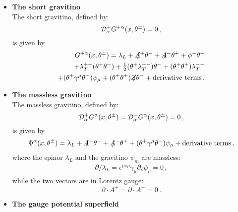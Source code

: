 \documentclass[a4paper,12pt]{article}
\newcommand{\ft}[2]{{\textstyle\frac{#1}{#2}}}
\begin{document}
\begin{itemize}
\begin{equation}
\end{equation}
\item {\bf The short gravitino}\\
The short gravitino, defined by:
\begin{equation}
{\cal D}^+_\alpha G^{+\alpha}(x,\theta^{\pm})=0\,,
\end{equation}
is given by
\begin{eqnarray}
G^{+\alpha}(x,\theta^{\pm})=\lambda_L+A\!\!\!/^+\theta^-
+A\!\!\!/^-\theta^++\phi^-\theta^+\nonumber\\
+\lambda^{+-}_T(\theta^+\theta^-)
+\ft{1}{2}(\theta^+\lambda^{+-}_T)\theta^-
+(\theta^+\theta^+)\lambda^{--}_T\nonumber\\
+(\theta^+\gamma^\mu\theta^-)\psi_\mu
+(\theta^+\theta^+)Z\!\!\!/\theta^-+{\rm derivative\ terms}\,.
\end{eqnarray}
\item {\bf The massless gravitino}\\
The massless gravitino, defined by:
\begin{equation}
{\cal D}^+_\alpha G^\alpha(x,\theta^{\pm})=
{\cal D}^-_\alpha G^\alpha(x,\theta^{\pm})=0\,,
\end{equation}
is given by
\begin{eqnarray}
\Phi^\alpha(x,\theta^{\pm})=\lambda_L+A\!\!\!/^+\theta^-
+A\!\!\!/^-\theta^+
+(\theta^+\gamma^\mu\theta^-)\psi_\mu
+{\rm derivative\ terms}\,,
\end{eqnarray}
where the spinor $\lambda_L$ and the gravitino $\psi_m$ are massless:
\begin{eqnarray}
\partial\!\!\!/\lambda_L=\epsilon^{\mu\nu\rho}\gamma_\mu\partial_\nu\psi_\rho=0\,,
\end{eqnarray}
while the two vectors are in Lorentz gauge:
\begin{equation}
\partial\cdot A^+=\partial\cdot A^-=0\,.
\end{equation}
\item {\bf The gauge potential superfield}\\

\end{itemize}
\end{document}
